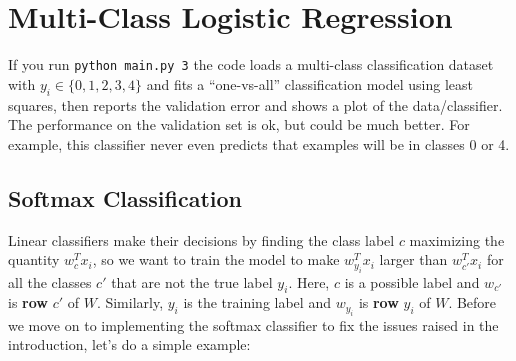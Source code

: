 \documentclass{article}
\begin{document}
\pagebreak


\section{Multi-Class Logistic Regression}

If you run \verb|python main.py 3| the code loads a multi-class
classification dataset with $y_i \in \{0,1,2,3,4\}$ and fits a ``one-vs-all'' classification
model using least squares, then reports the validation error and shows a plot of the data/classifier.
The performance on the validation set is ok, but could be much better.
For example, this classifier never even predicts that examples will be in classes 0 or 4.

\subsection{Softmax Classification}

Linear classifiers make their decisions by finding the class label $c$ maximizing the quantity $w_c^Tx_i$, so we want to train the model to make $w_{y_i}^Tx_i$ larger than $w_{c'}^Tx_i$ for all the classes $c'$ that are not the true label $y_i$.
Here, $c$ is a possible label and $w_{c'}$ is \textbf{row} $c'$ of $W$. Similarly, $y_i$ is the training label and $w_{y_i}$ is \textbf{row} $y_i$ of $W$. Before we move on to implementing the softmax classifier to fix the issues raised in the introduction, let's do a simple example:
\end{document}
